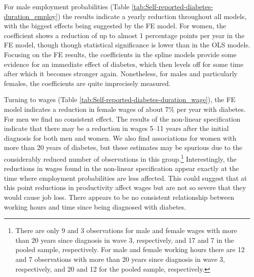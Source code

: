 For male employment probabilities (Table \ref{tab:Self-reported-diabetes-duration_employ}) the results indicate a yearly reduction throughout all models, with the biggest effects being suggested by the \ac{FE} model. For women, the coefficient shows a reduction of up to almost 1 percentage points per year in the \ac{FE} model, though though statistical significance is lower than in the \ac{OLS} models. Focusing on the \ac{FE} results, the coefficients in the spline models provide some evidence for an immediate effect of diabetes, which then levels off for some time after which it becomes stronger again. Nonetheless, for males and particularly females, the coefficients are quite imprecisely measured.

Turning to wages (Table \ref{tab:Self-reported-diabetes-duration_wage}), the \ac{FE} model indicates a reduction in female wages of about 7\% per year with diabetes. For men we find no consistent effect. The results of the non-linear specification indicate that there may be a reduction in wages 5--11 years after the initial diagnosis for both men and women. We also find associations for women with more than 20 years of diabetes, but these estimates may be spurious due to the considerably reduced number of observations in this group.\footnote{There are only 9 and 3 observations for male and female wages with more than 20 years since diagnosis in wave 3, respectively, and 17 and 7 in the pooled sample, respectively. For male and female working hours there are 12 and 7 observations with more than 20 years since diagnosis in wave 3, respectively, and 20 and 12 for the pooled sample, respectively.} Interestingly, the reductions in wages found in the non-linear specification appear exactly at the time where employment probabilities are less affected. This could suggest that at this point reductions in productivity affect wages but are not so severe that they would cause job loss. There appears to be no consistent relationship between working hours and time since being diagnosed with diabetes.
   

